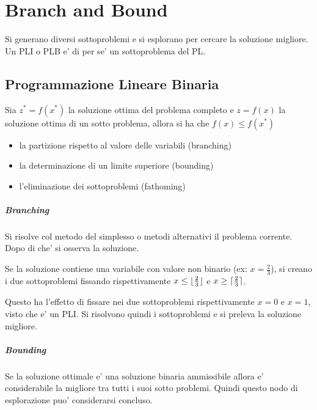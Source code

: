 \chapter{Branch and Bound}

Si generano diversi sottoproblemi e si esplorano per cercare la soluzione migliore.
Un PLI o PLB e' di per se' un sottoproblema del PL.

\section{Programmazione Lineare Binaria}

Sia $z^* = f(x^*)$ la soluzione ottima del problema completo e $z = f(x)$ la soluzione ottima di un sotto problema, allora si ha che $f(x) \leq f(x^*)$

\begin{itemize}
    \item la partizione rispetto al valore delle variabili (branching)
    \item la determinazione di un limite superiore (bounding)
    \item l'eliminazione dei sottoproblemi (fathoming)
\end{itemize}

\paragraph{Branching}

Si risolve col metodo del simplesso o metodi alternativi il problema corrente. Dopo di che' si osserva la soluzione.


Se la soluzione contiene una variabile con valore non binario (ex: $x = \frac 2 3$), si creano i due sottoproblemi fissando rispettivamente $x \leq \lfloor\frac {2} {3}\rfloor$ e $x \geq \lceil\frac {2} {3}\rceil$.

Questo ha l'effetto di fissare nei due sottoproblemi rispettivamente $x = 0$ e $x = 1$, visto che e' un PLI.
Si risolvono quindi i sottoproblemi e si preleva la soluzione migliore.

\paragraph{Bounding}

Se la soluzione ottimale e' una soluzione binaria ammissibile allora e' considerabile la migliore tra tutti i suoi sotto problemi. Quindi questo nodo di esplorazione puo' considerarsi concluso.

